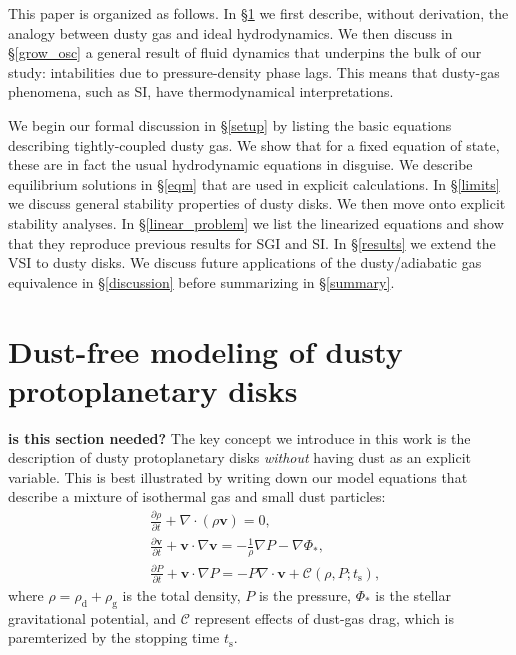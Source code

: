 \documentclass[iop, numberedappendix]{emulateapj}
\newcommand{\p}{\partial}
\newcommand{\rhod}{\rho_\mathrm{d}}
\newcommand{\rhog}{\rho_\mathrm{g}}
\newcommand{\tstop}{t_\mathrm{s}}
\begin{document}
This paper is organized as follows. In \S\ref{key_idea} we first
describe, without derivation, the analogy between dusty gas and    
ideal hydrodynamics. We then discuss in 
\S\ref{grow_osc} a general result of fluid dynamics that
underpins the bulk of our study: intabilities due to 
pressure-density phase lags. This means that dusty-gas phenomena, such
as SI, have thermodynamical interpretations.  

We begin our formal discussion in \S\ref{setup} by listing the 
basic equations describing tightly-coupled dusty gas. We show that for a
fixed equation of state, these are in 
fact the usual hydrodynamic equations in disguise. 
We describe equilibrium solutions in \S\ref{eqm} that are used in
explicit calculations. In \S\ref{limits} we discuss 
general stability properties of dusty disks. We then move onto
explicit stability analyses. In  
\S\ref{linear_problem} we list the linearized equations and show that 
they reproduce previous results for SGI and SI. In \S\ref{results} we
extend the VSI to dusty disks. We   
discuss future applications of the dusty/adiabatic gas equivalence in 
\S\ref{discussion} before summarizing in \S\ref{summary}. 




\section{Dust-free modeling of dusty protoplanetary disks}\label{key_idea}
{\bf is this section needed?} 
The key concept we introduce in this work is the description
of dusty protoplanetary disks \emph{without} having dust as an
explicit variable. This is best illustrated by writing down our model  
equations that describe a mixture of isothermal gas and small
dust particles: 
\begin{align}  
  &\frac{\p \rho}{\p t} + \nabla\cdot\left(\rho\bm{v}\right)= 0, \label{mass0}\\ 
  &\frac{\p\bm{v}}{\p t} + \bm{v}\cdot\nabla\bm{v} = -
  \frac{1}{\rho}\nabla  P - \nabla \Phi_*,\label{mom0}\\ 
 & \frac{\p P}{\p t} + \bm{v}\cdot\nabla P 
  = - P \nabla\cdot\bm{v}
                + \mathcal{C}(\rho, P; \tstop)\label{en0}, 
\end{align}
where $\rho=\rhod + \rhog$ is the total density, $P$ is the pressure,
$\Phi_*$ is the stellar gravitational potential,   
and $\mathcal{C}$ represent effects of dust-gas drag, which
is paremterized by the stopping time $\tstop$.     
\end{document}
